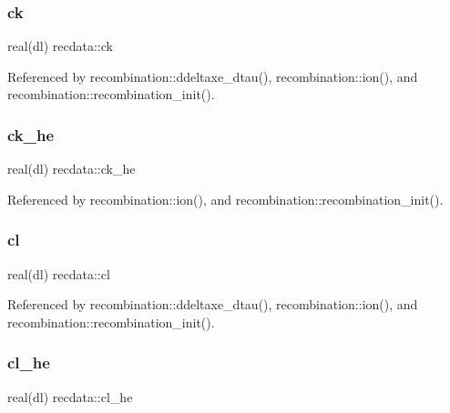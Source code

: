 \mbox{\label{namespacerecdata_aba2f0c8512427aa917fc8cac8bc0ec4e}} 
\subsubsection{\texorpdfstring{ck}{ck}}
{\footnotesize\ttfamily real(dl) recdata\+::ck}



Referenced by recombination\+::ddeltaxe\+\_\+dtau(), recombination\+::ion(), and recombination\+::recombination\+\_\+init().

\mbox{\label{namespacerecdata_a13fa08cdf3070bc28dbc41bac31f8992}} 
\subsubsection{\texorpdfstring{ck\+\_\+he}{ck\_he}}
{\footnotesize\ttfamily real(dl) recdata\+::ck\+\_\+he}



Referenced by recombination\+::ion(), and recombination\+::recombination\+\_\+init().

\mbox{\label{namespacerecdata_ab68a51a351429e593781556b05330c60}} 
\subsubsection{\texorpdfstring{cl}{cl}}
{\footnotesize\ttfamily real(dl) recdata\+::cl}



Referenced by recombination\+::ddeltaxe\+\_\+dtau(), recombination\+::ion(), and recombination\+::recombination\+\_\+init().

\mbox{\label{namespacerecdata_ae811f636720451c3155e017e57bb09cf}} 
\subsubsection{\texorpdfstring{cl\+\_\+he}{cl\_he}}
{\footnotesize\ttfamily real(dl) recdata\+::cl\+\_\+he}



